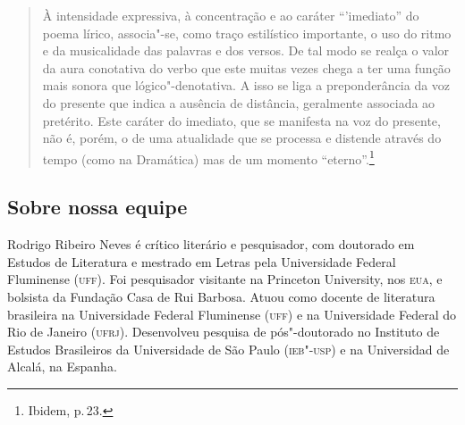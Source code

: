 \begin{quote}
À intensidade expressiva, à concentração e ao caráter ``'imediato'' do poema lírico, associa"-se, como traço estilístico importante, o uso do ritmo e da musicalidade das palavras e dos versos. De tal modo se realça o valor da aura conotativa do verbo que este muitas vezes chega a ter uma função mais sonora que lógico"-denotativa. A isso se liga a preponderância da voz do presente que indica a ausência de distância, geralmente associada ao pretérito. Este caráter do imediato, que se manifesta na voz do presente, não é, porém, o de uma atualidade que se processa e distende através do tempo (como na Dramática) mas de um momento ``eterno''.\footnote{Ibidem, p.\,23.}
\end{quote}



\subsection{Sobre nossa equipe}

Rodrigo Ribeiro Neves é crítico literário e pesquisador, com doutorado em Estudos de Literatura e mestrado em Letras pela Universidade Federal Fluminense (\textsc{uff}). Foi pesquisador visitante na Princeton University, nos \textsc{eua}, e bolsista da Fundação Casa de Rui Barbosa. Atuou como docente de literatura brasileira na Universidade Federal Fluminense (\textsc{uff}) e na Universidade Federal do Rio de Janeiro (\textsc{ufrj}). Desenvolveu pesquisa de pós"-doutorado no Instituto de Estudos Brasileiros da Universidade de São Paulo (\textsc{ieb"-usp}) e na Universidad de Alcalá, na Espanha.